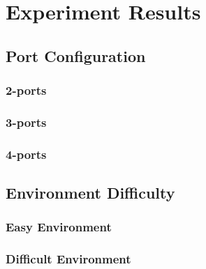

\section{Experiment Results}
\subsection{Port Configuration}
\subsubsection{2-ports}
\begin{figure}[H]
	
\end{figure}

\subsubsection{3-ports}
\begin{figure}[H]
	
\end{figure}

\subsubsection{4-ports}
\begin{figure}[H]
	
\end{figure}

\subsection{Environment Difficulty}
\subsubsection{Easy Environment}
\begin{figure}[H]
	
\end{figure}

\subsubsection{Difficult Environment}
\begin{figure}[H]
	
\end{figure}



